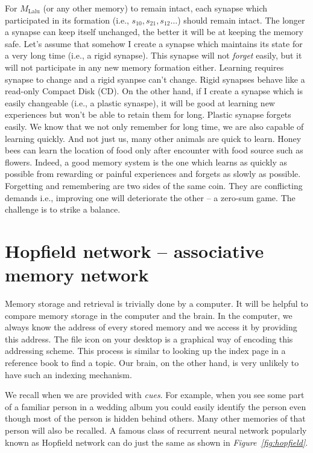 \documentclass[]{resonance}
\newcommand\Fig[1]{\textit{Figure~\ref{#1}}}
\begin{document}
For $M_\text{Lalu}$ (or any other memory) to remain intact, each synapse which
participated in its formation (i.e., $s_{10}, s_{21}, s_{12} \ldots$) should
remain intact. The longer a synapse can keep itself unchanged, the better it
will be at keeping the memory safe. Let's assume that somehow I create a synapse
which maintains its state for a very long time (i.e., a rigid synapse). This
synapse will not \emph{forget} easily, but it will not participate in any new
memory formation either. Learning requires synapse to change and a rigid syanpse
can't change.  Rigid synapses behave like a read-only Compact Disk (CD). On the
other hand, if I create a synapse which is easily changeable (i.e., a plastic
synaspe), it will be good at learning new experiences but won't be able to
retain them for long. Plastic synapse forgets easily.  We know that we not only
remember for long time, we are also capable of learning quickly. And not just
us, many other animals are quick to learn. Honey bees can learn the location of
food only after encounter with food source such as flowers. Indeed, a good memory
system is the one which learns as quickly as possible from rewarding or painful
experiences and forgets as slowly as possible. Forgetting and remembering are
two sides of the same coin. They are conflicting demands i.e., improving one
will deteriorate the other -- a zero-sum game.  The challenge is to strike a
balance. 

\section{Hopfield network -- associative memory network}\label{sec:hopfield}

Memory storage and retrieval is trivially done by a computer. It will be helpful
to compare memory storage in the computer and the brain. In the computer, we
always know the address of every stored memory and we access it by providing
this address. The file icon on your desktop is a graphical way of encoding this
addressing scheme. This process is similar to looking up the index page in a
reference book to find a topic. Our brain, on the other hand, is very unlikely
to have such an indexing mechanism. 

We recall when we are provided with \textit{cues}. For example, when you see
some part of a familiar person in a wedding album you could easily identify the
person even though most of the person is hidden behind others.  Many other
memories of that person will also be recalled. A famous class of recurrent
neural network popularly known as Hopfield network can do just the same as shown
in \Fig{fig:hopfield}.
\end{document}
